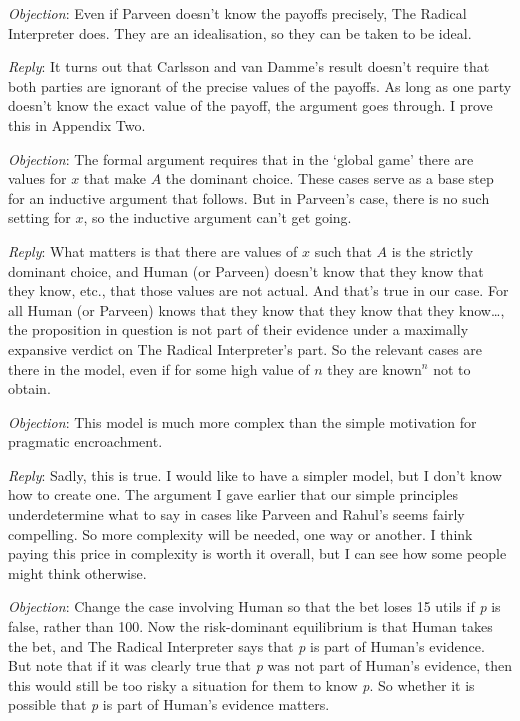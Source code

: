 \emph{Objection}: Even if Parveen doesn't know the payoffs precisely, The Radical Interpreter does. They are an idealisation, so they can be taken to be ideal.

\emph{Reply}: It turns out that Carlsson and van Damme's result doesn't require that both parties are ignorant of the precise values of the payoffs. As long as one party doesn't know the exact value of the payoff, the argument goes through. I prove this in Appendix Two.

\emph{Objection}: The formal argument requires that in the `global game' there are values for $x$ that make $A$ the dominant choice. These cases serve as a base step for an inductive argument that follows. But in Parveen's case, there is no such setting for $x$, so the inductive argument can't get going.

\emph{Reply}: What matters is that there are values of $x$ such that $A$ is the strictly dominant choice, and Human (or Parveen) doesn't know that they know that they know, etc., that those values are not actual. And that's true in our case. For all Human (or Parveen) knows that they know that they know that they know{\ldots}, the proposition in question is not part of their evidence under a maximally expansive verdict on The Radical Interpreter's part. So the relevant cases are there in the model, even if for some high value of $n$ they are known$^n$ not to obtain.

\emph{Objection}: This model is much more complex than the simple motivation for pragmatic encroachment.

\emph{Reply}: Sadly, this is true. I would like to have a simpler model, but I don't know how to create one. The argument I gave earlier that our simple principles underdetermine what to say in cases like Parveen and Rahul's seems fairly compelling. So more complexity will be needed, one way or another. I think paying this price in complexity is worth it overall, but I can see how some people might think otherwise.

\emph{Objection}: Change the case involving Human so that the bet loses 15 utils if \emph{p} is false, rather than 100. Now the risk-dominant equilibrium is that Human takes the bet, and The Radical Interpreter says that \emph{p} is part of Human's evidence. But note that if it was clearly true that \emph{p} was not part of Human's evidence, then this would still be too risky a situation for them to know \emph{p}. So whether it is possible that \emph{p} is part of Human's evidence matters.

